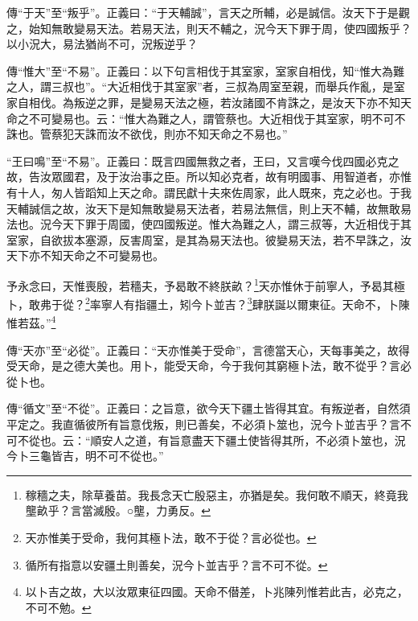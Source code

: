 {\noindent\zhuan{}\fzbyks 傳“于天”至“叛乎”。正義曰：“于天輔誠”，言天之所輔，必是誠信。汝天下于是觀之，始知無敢變易天法。若易天法，則天不輔之，況今天下罪于周，使四國叛乎？以小況大，易法猶尚不可，況叛逆乎？ \par}

{\noindent\zhuan{}\fzbyks 傳“惟大”至“不易”。正義曰：以下句言相伐于其室家，室家自相伐，知“惟大為難之人，謂三叔也”。“大近相伐于其室家”者，三叔為周室至親，而舉兵作亂，是室家自相伐。為叛逆之罪，是變易天法之極，若汝諸國不肯誅之，是汝天下亦不知天命之不可變易也。云：“惟大為難之人，謂管蔡也。大近相伐于其室家，明不可不誅也。管蔡犯天誅而汝不欲伐，則亦不知天命之不易也。” \par}

{\noindent\shu{}\fzkt “王曰鳴”至“不易”。正義曰：既言四國無救之者，王曰，又言嘆今伐四國必克之故，告汝眾國君，及于汝治事之臣。所以知必克者，故有明國事、用智道者，亦惟有十人，匆人皆蹈知上天之命。謂民獻十夫來佐周家，此人既來，克之必也。于我天輔誠信之故，汝天下是知無敢變易天法者，若易法無信，則上天不輔，故無敢易法也。況今天下罪于周國，使四國叛逆。惟大為難之人，謂三叔等，大近相伐于其室家，自欲拔本塞源，反害周室，是其為易天法也。彼變易天法，若不早誅之，汝天下亦不知天命之不可變易也。 \par}

予永念曰，天惟喪殷，若穡夫，予曷敢不終朕畝？\footnote{稼穡之夫，除草養苗。我長念天亡殷惡主，亦猶是矣。我何敢不順天，終竟我壟畝乎？言當滅殷。○壟，力勇反。}天亦惟休于前寧人，予曷其極卜，敢弗于從？\footnote{天亦惟美于受命，我何其極卜法，敢不于從？言必從也。}率寧人有指疆土，矧今卜並吉？\footnote{循所有指意以安疆土則善矣，況今卜並吉乎？言不可不從。}肆朕誕以爾東征。天命不，卜陳惟若茲。”\footnote{以卜吉之故，大以汝眾東征四國。天命不僣差，卜兆陳列惟若此吉，必克之，不可不勉。}


{\noindent\zhuan{}\fzbyks 傳“天亦”至“必從”。正義曰：“天亦惟美于受命”，言德當天心，天每事美之，故得受天命，是之德大美也。用卜，能受天命，今于我何其窮極卜法，敢不從乎？言必從卜也。 \par}

{\noindent\zhuan{}\fzbyks 傳“循文”至“不從”。正義曰：之旨意，欲今天下疆土皆得其宜。有叛逆者，自然須平定之。我直循彼所有旨意伐叛，則已善矣，不必須卜筮也，況今卜並吉乎？言不可不從也。云：“順安人之道，有旨意盡天下疆土使皆得其所，不必須卜筮也，況今卜三龜皆吉，明不可不從也。” \par}

